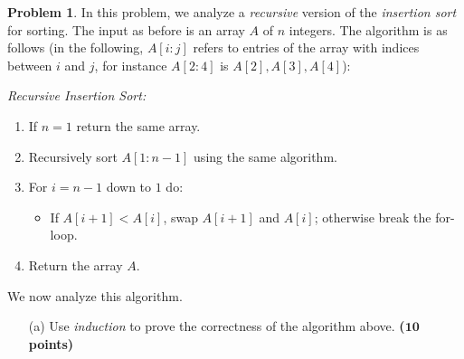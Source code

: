 \documentclass{article}
\theoremstyle{definition}
\newtheorem{problem}{Problem}
\newcommand{\grade}[1]{\hfill{\textbf{($\mathbf{#1}$ points)}}}
\begin{document}
\smallskip


\begin{problem}
	In this problem, we analyze a \emph{recursive} version of the \emph{insertion sort} for sorting. The input as before is an array $A$ of $n$ integers. 
	The algorithm is as follows (in the following, $A[i:j]$ refers to entries of the array with indices between $i$ and $j$, for instance $A[2:4]$ is $A[2],A[3],A[4]$): 
	
	\emph{Recursive Insertion Sort:} 
	\begin{enumerate}
		\item If $n=1$ return the same array. 
		\item Recursively sort $A[1:n-1]$ using the same algorithm.
		\item For $i=n-1$ down to $1$ do: 
		\begin{itemize}
			\item If $A[i+1] < A[i]$, swap $A[i+1]$ and $A[i]$; otherwise break the for-loop.
		\end{itemize}
		\item Return the array $A$. 
	\end{enumerate}
	
	We now analyze this algorithm. 
	
	\begin{enumerate}
	\item[(a)] Use \emph{induction} to prove the correctness of the algorithm above. \grade{10}
	

\end{enumerate}
\end{problem}
\end{document}
